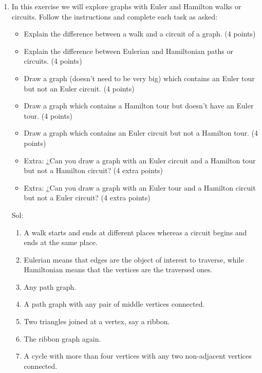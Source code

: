 \documentclass[12pt]{exam}
\begin{document}
\begin{enumerate}
\item In this exercise we will explore graphs with Euler and Hamilton walks or circuits. Follow the instructions and complete each task as asked:
\begin{itemize}
    \item Explain the difference between a walk and a circuit of a graph. (4 points)
    \item Explain the difference between Eulerian and Hamiltonian paths or circuits. (4 points)
    \item Draw a graph (doesn't need to be very big) which contains an Euler tour but not an Euler circuit. (4 points)
    \item Draw a graph which contains a Hamilton tour but doesn't have an Euler tour. (4 points)
    \item Draw a graph which contains an Euler circuit but not a Hamilton tour. (4 points)
    \item Extra: ¿Can you draw a graph with an Euler circuit and a Hamilton tour but not a Hamilton circuit? (4 extra points)
    \item Extra: ¿Can you draw a graph with an Euler tour and a Hamilton circuit but not a Euler circuit? (4 extra points)
\end{itemize}


Sol:
\begin{enumerate}
    \item A walk starts and ends at different places whereas a circuit begins and ends at the same place.
    \item Eulerian means that edges are the object of interest to traverse, while Hamiltonian means that the vertices are the traversed ones.
    \item Any path graph.
    \item A path graph with any pair of middle vertices connected.
    \item Two triangles joined at a vertex, say a ribbon.
    \item The ribbon graph again.
    \item A cycle with more than four vertices with any two non-adjacent vertices connected.
\end{enumerate}


\end{enumerate}
\end{document}
